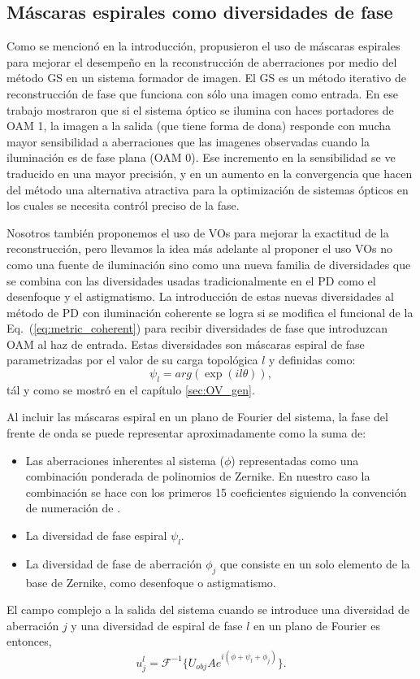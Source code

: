 \subsection{Máscaras espirales como diversidades de fase}
\label{sec:ChPD_PD_Spiral_Diversity}
Como se mencionó en la introducción, 
propusieron el uso de máscaras espirales para mejorar el desempeño en
la reconstrucción de aberraciones por medio del método GS en un
sistema formador de imagen. El GS es un método iterativo de
reconstrucción de fase que funciona con sólo una imagen como
entrada. En ese trabajo mostraron que si el sistema
óptico se ilumina con haces portadores de OAM 1, la imagen a la salida
(que tiene forma de dona) responde con mucha mayor sensibilidad a aberraciones que las
imagenes observadas cuando la iluminación es de fase plana (OAM 0). Ese
incremento en la sensibilidad se ve traducido en una mayor
precisión, y en un aumento en la convergencia que hacen del método una alternativa
atractiva para la optimización de sistemas ópticos en los cuales se
necesita contról preciso de la fase. 

Nosotros también proponemos el uso de VOs para mejorar la exactitud de
la reconstrucción, pero llevamos la idea más adelante al proponer el
uso VOs no como una fuente de iluminación sino como una nueva familia
de diversidades que se combina con las diversidades usadas
tradicionalmente en el PD como el desenfoque y el astigmatismo. La
introducción de estas nuevas diversidades al método de PD con
iluminación coherente se logra si se modifica el funcional de la
Eq.~(\ref{eq:metric_coherent})  para recibir diversidades de fase que
introduzcan OAM al haz de entrada.
Estas diversidades son máscaras espiral de fase parametrizadas por el
valor de su carga topológica $l$ y definidas como:
$$\psi_l = arg(\exp{(il \theta)}),$$
tál y como se mostró en el capítulo \ref{sec:OV_gen}. 

Al incluir las máscaras espiral en un plano de Fourier del sistema, la fase del frente de
onda se puede representar aproximadamente como la suma de:
\begin{itemize}
\item Las aberraciones inherentes al sistema ($\phi$) representadas como una
  combinación ponderada de polinomios de Zernike. En nuestro caso la
  combinación se hace con los primeros 15 coeficientes siguiendo la
  convención de numeración de . 
\item La diversidad de fase espiral $\psi_l$.
\item La diversidad de fase de aberración $\phi_j$ que consiste en
  un solo elemento de la base de Zernike, como desenfoque o
  astigmatismo. 
\end{itemize}
El campo complejo a la salida del sistema cuando se introduce una diversidad de
aberración $j$ y una diversidad de espiral de fase $l$ en un plano de
Fourier es entonces,
\begin{equation}\label{eq:newGP}
 u_j^l =  \mathcal{F}^{- 1}\{U_{obj} A e^{i\left(
     \phi+ \psi_l + \phi_j \right)} \}.
\end{equation}


